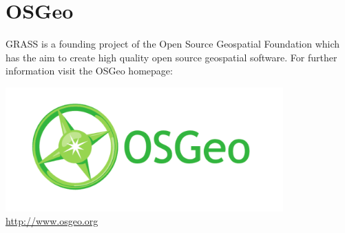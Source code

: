 \documentclass[notumble,a4paper,10pt,nofoldmark]{leaflet}
\begin{document}
\vfill
\section{OSGeo}

GRASS is a founding project of the Open Source Geospatial Foundation which has the aim to create high quality open source geospatial software. For further information visit the OSGeo homepage:
\begin{center}
\includegraphics[width=0.8\textwidth]{OSGeo_CMYK}\\
\url{http://www.osgeo.org}
\end{center}
\end{document}
